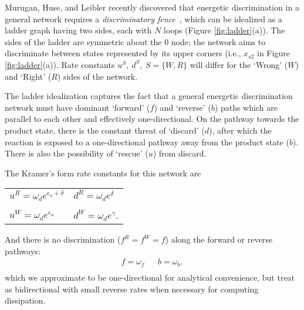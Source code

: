 
Murugan, Huse, and Leibler recently discovered that energetic discrimination in a general network requires a {\it discriminatory fence}~\cite{Murugan2014}, which can be idealized as a ladder graph having two sides, each with $N$ loops (Figure \ref{fig:ladder}(a)).  The sides of the ladder are symmetric about the $0$ node; the network aims to discriminate between states represented by its upper corners (i.e., $x_{s2}$ in Figure \ref{fig:ladder}(a)).  Rate constants $u^S,\ d^S, \ S=\{W, R\}$ will differ for the `Wrong' ($W$) and `Right' ($R$) sides of the network.

The ladder idealization captures the fact that a general energetic discrimination network must have dominant `forward' ($f$) and `reverse' ($b$) paths which are parallel to each other and effectively one-directional.  On the pathway towards the product state, there is the constant threat of `discard' ($d$), after which the reaction is exposed to a one-directional pathway away from the product state ($b$).  There is also the possibility of `rescue' ($u$) from discard. 

The Kramer's form rate constants for this network are
\begin{center}
\begin{tabular}{ll}
$u^R = \omega_d e^{\epsilon_u+\delta}$ & $d^R = \omega_d e^{\delta}$\\
\\
$u^W =  \omega_d e^{\epsilon_u} $&$ d^W = \omega_d e^{\gamma}$.\\
\end{tabular}
\end{center}
And there is no discrimination ($f^R=f^W=f$) along the forward or reverse pathways:
\[
\begin{aligned}
f = \omega_f & & b = \omega_b,\\
\end{aligned}
\]
which we approximate to be one-directional for analytical convenience, but treat as bidirectional with small reverse rates when necessary for computing dissipation.

